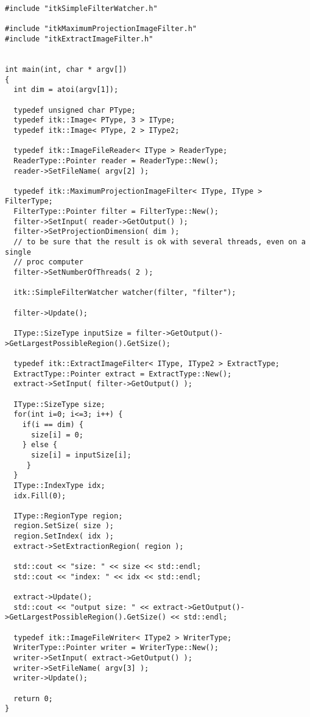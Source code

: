\documentclass{InsightArticle}
\begin{document}
\small \begin{verbatim}
#include "itkSimpleFilterWatcher.h"

#include "itkMaximumProjectionImageFilter.h"
#include "itkExtractImageFilter.h"


int main(int, char * argv[])
{
  int dim = atoi(argv[1]);

  typedef unsigned char PType;
  typedef itk::Image< PType, 3 > IType;
  typedef itk::Image< PType, 2 > IType2;

  typedef itk::ImageFileReader< IType > ReaderType;
  ReaderType::Pointer reader = ReaderType::New();
  reader->SetFileName( argv[2] );

  typedef itk::MaximumProjectionImageFilter< IType, IType > FilterType;
  FilterType::Pointer filter = FilterType::New();
  filter->SetInput( reader->GetOutput() );
  filter->SetProjectionDimension( dim );
  // to be sure that the result is ok with several threads, even on a single
  // proc computer
  filter->SetNumberOfThreads( 2 );

  itk::SimpleFilterWatcher watcher(filter, "filter");

  filter->Update();

  IType::SizeType inputSize = filter->GetOutput()->GetLargestPossibleRegion().GetSize();

  typedef itk::ExtractImageFilter< IType, IType2 > ExtractType;
  ExtractType::Pointer extract = ExtractType::New();
  extract->SetInput( filter->GetOutput() );

  IType::SizeType size;
  for(int i=0; i<=3; i++) {
    if(i == dim) {
      size[i] = 0;
    } else {
      size[i] = inputSize[i];
     }
  }
  IType::IndexType idx;
  idx.Fill(0);

  IType::RegionType region;
  region.SetSize( size );
  region.SetIndex( idx );
  extract->SetExtractionRegion( region );

  std::cout << "size: " << size << std::endl;
  std::cout << "index: " << idx << std::endl;

  extract->Update();
  std::cout << "output size: " << extract->GetOutput()->GetLargestPossibleRegion().GetSize() << std::endl;

  typedef itk::ImageFileWriter< IType2 > WriterType;
  WriterType::Pointer writer = WriterType::New();
  writer->SetInput( extract->GetOutput() );
  writer->SetFileName( argv[3] );
  writer->Update();

  return 0;
}
\end{verbatim} \normalsize
\end{document}
